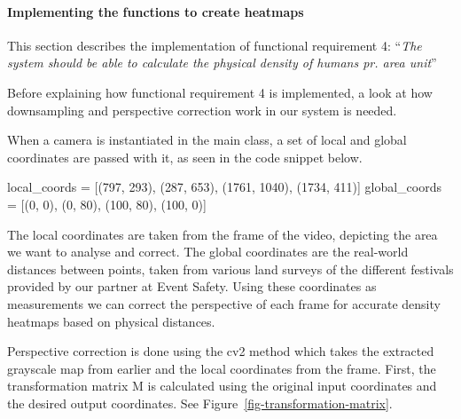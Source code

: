 \documentclass[
]{article}
\newenvironment{Shaded}{\begin{snugshade}}{\end{snugshade}}
\newcommand{\DecValTok}[1]{\textcolor[rgb]{0.68,0.00,0.00}{#1}}
\newcommand{\NormalTok}[1]{\textcolor[rgb]{0.00,0.23,0.31}{#1}}
\newcommand{\OperatorTok}[1]{\textcolor[rgb]{0.37,0.37,0.37}{#1}}
\begin{document}
\hypertarget{sec-correction}{%
\paragraph{Implementing the functions to create
heatmaps}\label{sec-correction}}

This section describes the implementation of functional requirement 4:
``\emph{The system should be able to calculate the physical density of
humans pr. area unit}''

Before explaining how functional requirement 4 is implemented, a look at
how downsampling and perspective correction work in our system is
needed.

When a camera is instantiated in the main class, a set of local and
global coordinates are passed with it, as seen in the code snippet
below.

\begin{Shaded}
\begin{Highlighting}[]
\NormalTok{local\_coords }\OperatorTok{=}\NormalTok{ [(}\DecValTok{797}\NormalTok{, }\DecValTok{293}\NormalTok{), (}\DecValTok{287}\NormalTok{, }\DecValTok{653}\NormalTok{), (}\DecValTok{1761}\NormalTok{, }\DecValTok{1040}\NormalTok{), (}\DecValTok{1734}\NormalTok{, }\DecValTok{411}\NormalTok{)]}
\NormalTok{global\_coords }\OperatorTok{=}\NormalTok{ [(}\DecValTok{0}\NormalTok{, }\DecValTok{0}\NormalTok{), (}\DecValTok{0}\NormalTok{, }\DecValTok{80}\NormalTok{), (}\DecValTok{100}\NormalTok{, }\DecValTok{80}\NormalTok{), (}\DecValTok{100}\NormalTok{, }\DecValTok{0}\NormalTok{)]}
\end{Highlighting}
\end{Shaded}

The local coordinates are taken from the frame of the video, depicting
the area we want to analyse and correct. The global coordinates are the
real-world distances between points, taken from various land surveys of
the different festivals provided by our partner at Event Safety. Using
these coordinates as measurements we can correct the perspective of each
frame for accurate density heatmaps based on physical distances.

Perspective correction is done using the cv2 method which takes the
extracted grayscale map from earlier and the local coordinates from the
frame. First, the transformation matrix M is calculated using the
original input coordinates and the desired output coordinates. See
Figure~\ref{fig-transformation-matrix}.
\end{document}
